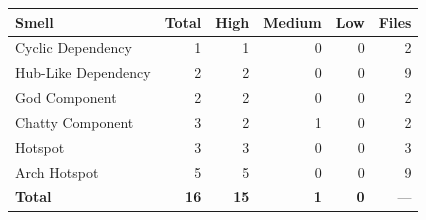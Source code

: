 \begin{tabular}{l|r|r|r|r|r}
\hline
\textbf{Smell} & \textbf{Total} & \textbf{High} & \textbf{Medium} & \textbf{Low} & \textbf{Files} \\
\hline
Cyclic Dependency & 1 & 1 & 0 & 0 & 2 \\
Hub-Like Dependency & 2 & 2 & 0 & 0 & 9 \\
God Component & 2 & 2 & 0 & 0 & 2 \\
Chatty Component & 3 & 2 & 1 & 0 & 2 \\
Hotspot & 3 & 3 & 0 & 0 & 3 \\
Arch Hotspot & 5 & 5 & 0 & 0 & 9 \\
\hline
\textbf{Total}       & \textbf{16} & \textbf{15} & \textbf{1} & \textbf{0} & --- \\
\hline
\end{tabular}